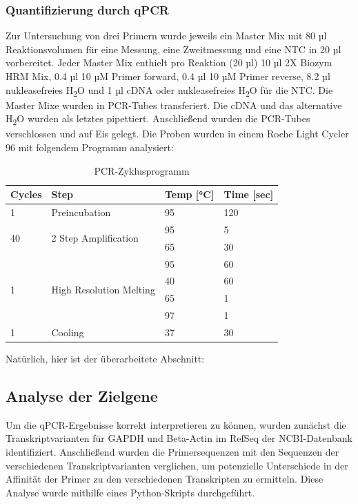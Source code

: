 \documentclass{article}
\begin{document}
\subsubsection*{Quantifizierung durch qPCR}
Zur Untersuchung von drei Primern wurde jeweils ein
Master Mix mit 80 µl Reaktionsvolumen für eine Messung,
eine Zweitmessung und eine NTC in 20 µl vorbereitet.
Jeder Master Mix enthielt pro Reaktion (20 µl) 10 µl 2X Biozym HRM Mix,
0.4 µl 10 µM Primer forward, 0.4 µl 10 µM Primer reverse, 8.2 µl
nukleasefreies H\textsubscript{2}O und 1 µl cDNA oder
nukleasefreies H\textsubscript{2}O für die NTC. Die Master Mixe
wurden in PCR-Tubes transferiert. Die cDNA und das
alternative H\textsubscript{2}O wurden als letztes pipettiert.
Anschließend wurden die PCR-Tubes verschlossen und auf Eis gelegt.
Die Proben wurden in einem Roche Light Cycler 96 mit folgendem
Programm analysiert:

\begin{table}[H]
    \centering
    \begin{tabular}{|l|l|l|l|}
    \hline
    \textbf{Cycles} & \textbf{Step} & \textbf{Temp [°C]} & \textbf{Time [sec]} \\ \hline
    1 & Preincubation & 95 & 120 \\ \hline
    \multirow{2}{*}{40} & \multirow{2}{*}{2 Step Amplification} & 95 & 5 \\ \cline{3-4}
     &  & 65 & 30 \\ \hline
    \multirow{4}{*}{1} & \multirow{4}{*}{High Resolution Melting} & 95 & 60 \\ \cline{3-4}
     &  & 40 & 60 \\ \cline{3-4}
     &  & 65 & 1 \\ \cline{3-4}
     &  & 97 & 1 \\ \hline
    1 & Cooling & 37 & 30 \\ \hline
    \end{tabular}
    \caption{PCR-Zyklusprogramm}
    \end{table}
  

    Natürlich, hier ist der überarbeitete Abschnitt:

\subsection{Analyse der Zielgene}
Um die qPCR-Ergebnisse korrekt interpretieren zu können, wurden zunächst die Transkriptvarianten für GAPDH und Beta-Actin im RefSeq der NCBI-Datenbank identifiziert. Anschließend wurden die Primersequenzen mit den Sequenzen der verschiedenen Transkriptvarianten verglichen, um potenzielle Unterschiede in der Affinität der Primer zu den verschiedenen Transkripten zu ermitteln. Diese Analyse wurde mithilfe eines Python-Skripts durchgeführt.
    
\end{document}
